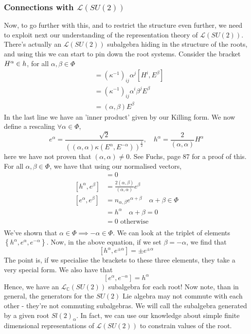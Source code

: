 \subsubsection{Connections with $ \mathcal{ L } ( SU ( 2) ) $} 
Now, to go further with this, 
and to restrict the structure even further, 
we need to exploit next our understanding 
of the representation theory of $\mathcal{ L } ( SU ( 2) ) $. 
There's actually an $ \mathcal{ L } ( SU ( 2) ) $ subalgebra 
hiding in the structure of the roots, and using 
this we can start to pin down the root systems. 
Consider the bracket $ H ^ \alpha \in h$, 
for all  $ \alpha, \beta \in \Phi $
\begin{align*}
	[ H ^ \alpha , E ^ \beta ] &=  \left(  \kappa ^{ - 1 }  \right) _{ ij } 
	\alpha ^ j [ H^ i , E^ \beta ] \\ 
				   &=  \left(  \kappa ^{ - 1}  \right)_{ ij  } 
				   \alpha ^ i \beta ^ j E ^ \beta  \\
				   &=  ( \alpha , \beta ) E ^ \beta  
\end{align*}
In the last line we have an 'inner product' 
given by our Killing form. 
We now define a rescaling $ \forall \alpha \in \Phi $, 
\[
	e ^ \alpha  = \frac{\sqrt{2}  }{\left(  
	( \alpha, \alpha ) \kappa \left(  E ^ \alpha, E ^{ - \alpha }  \right)  \right) ^{ \frac{1}{2 } } }, 
	\quad h ^ \alpha  = \frac{2}{\left(  \alpha, \alpha \right)  } H ^ \alpha 
\] here we have not proven that $ \left(  \alpha , \alpha  \right)   \neq 0 $. 
See Fuchs, page 87 for a proof of this. 
For all $ \alpha , \beta \in \Phi $, we have that using 
our normalised vectors, 
\begin{align*} 
 [ h ^ \alpha , h ^ \beta ] &=  0  \\ 
 [ h ^ \alpha ,  e ^ \beta ] &=  \frac{ 2 \left(  \alpha, \beta  \right)  }{ \left(  
 \alpha , \alpha \right)  } e ^ \beta  \\
 [ e ^ \alpha , e ^\beta ] &=  n_{ \alpha, \beta } e ^{ \alpha + \beta } \quad \alpha + \beta \in \Phi  \\ 
 &=  h ^ \alpha \quad \alpha + \beta = 0  \\ 
 &=  0  \text{ otherwise }\\ 
\end{align*} 
We've shown that $ \alpha \in \Phi \implies  - \alpha \in \Phi $. 
We can look at the triplet of elements $ \left\{  h ^ \alpha , e ^ \alpha , e ^{ - \alpha } \right\}  $. 
Now, in the above equation, if we set $ \beta = - \alpha $, 
we find that 
\[
	[ h ^ \alpha, e ^{ \pm \alpha } ] = \pm e ^{ \pm \alpha }
\] The point is, if we specialise 
the brackets to these three elements, 
they take a very special form. We also have that 
\[
 \left[  e ^{ \alpha } , e ^{ - \alpha }  \right]   =h ^ \alpha 
\] Hence, we have an $ \mathcal{ L } _{ \mathbb{ C} } ( SU ( 2) ) $ 
subalgebra for each root! 
Now note, than in general, the generators for the $ SU ( 2) $ Lie 
algebra may not commute with each other - they're not 
commuting subalgebras. We will call 
the subalgebra generated by a given root $ Sl ( 2 )_ \alpha $. 
In fact, we can use our knowledge about simple 
finite dimensional representations of $ \mathcal{ L } ( SU ( 2) ) $
to constrain values of the root. 

